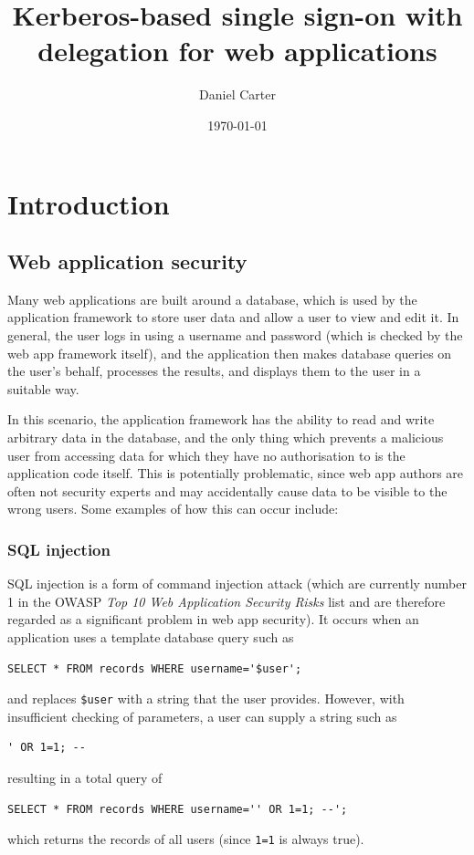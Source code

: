 \documentclass[12pt]{report}
\title{Kerberos-based single sign-on with delegation for web applications}
\author{Daniel Carter}
\date {\today}
\begin{document}
\maketitle

\tableofcontents

\chapter{Introduction}

\section{Web application security}
\label{sec:web_application_security}
Many web applications are built around a database, which is used by the application framework to store user data and allow a user to view and edit it. In general, the user logs in using a username and password (which is checked by the web app framework itself), and the application then makes database queries on the user's behalf, processes the results, and displays them to the user in a suitable way.

In this scenario, the application framework has the ability to read and write arbitrary data in the database, and the only thing which prevents a malicious user from accessing data for which they have no authorisation to is the application code itself. This is potentially problematic, since web app authors are often not security experts and may accidentally cause data to be visible to the wrong users. Some examples of how this can occur include:

\subsection{SQL injection}
\label{sec:sql_injection}
SQL injection is a form of command injection attack (which are currently number 1 in the OWASP \textit{Top 10 Web Application Security Risks} list\cite{OWASP10} and are therefore regarded as a significant problem in web app security). It occurs when an application uses a template database query such as
\begin{verbatim}
SELECT * FROM records WHERE username='$user';
\end{verbatim}
and replaces \verb+$user+ with a string that the user provides. However, with insufficient checking of parameters, a user can supply a string such as
\begin{verbatim}
' OR 1=1; --
\end{verbatim}
resulting in a total query of
\begin{verbatim}
SELECT * FROM records WHERE username='' OR 1=1; --';
\end{verbatim}
which returns the records of all users (since \verb+1=1+ is always true).
\end{document}
